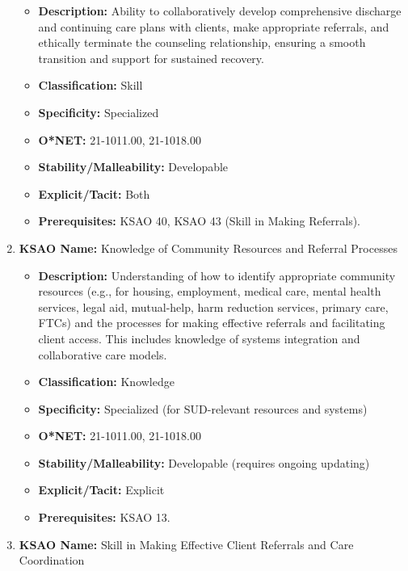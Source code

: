\documentclass[
  letterpaper,
  DIV=11,
  numbers=noendperiod]{scrartcl}
\providecommand{\tightlist}{%
  \setlength{\itemsep}{0pt}\setlength{\parskip}{0pt}}
\begin{document}
\begin{enumerate}
  \begin{itemize}
  \tightlist
  \item
    \textbf{Description:} Ability to collaboratively develop
    comprehensive discharge and continuing care plans with clients, make
    appropriate referrals, and ethically terminate the counseling
    relationship, ensuring a smooth transition and support for sustained
    recovery.
  \item
    \textbf{Classification:} Skill
  \item
    \textbf{Specificity:} Specialized
  \item
    \textbf{O*NET:} 21-1011.00, 21-1018.00
  \item
    \textbf{Stability/Malleability:} Developable
  \item
    \textbf{Explicit/Tacit:} Both
  \item
    \textbf{Prerequisites:} KSAO 40, KSAO 43 (Skill in Making
    Referrals).
  \end{itemize}
\item
  \textbf{KSAO Name:} Knowledge of Community Resources and Referral
  Processes

  \begin{itemize}
  \tightlist
  \item
    \textbf{Description:} Understanding of how to identify appropriate
    community resources (e.g., for housing, employment, medical care,
    mental health services, legal aid, mutual-help, harm reduction
    services, primary care, FTCs) and the processes for making effective
    referrals and facilitating client access. This includes knowledge of
    systems integration and collaborative care models.
  \item
    \textbf{Classification:} Knowledge
  \item
    \textbf{Specificity:} Specialized (for SUD-relevant resources and
    systems)
  \item
    \textbf{O*NET:} 21-1011.00, 21-1018.00
  \item
    \textbf{Stability/Malleability:} Developable (requires ongoing
    updating)
  \item
    \textbf{Explicit/Tacit:} Explicit
  \item
    \textbf{Prerequisites:} KSAO 13.
  \end{itemize}
\item
  \textbf{KSAO Name:} Skill in Making Effective Client Referrals and
  Care Coordination


\end{enumerate}
\end{document}
